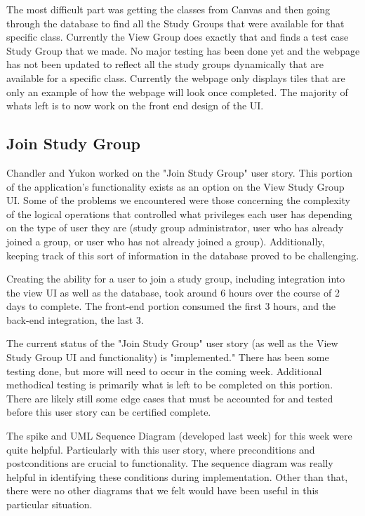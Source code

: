 \documentclass[12pt,letterpaper]{article}
\begin{document}
The most difficult part was getting the classes from Canvas and then going through the database to find all the Study Groups that were available for that specific class. Currently the View Group does exactly that and finds a test case Study Group that we made. No major testing has been done yet and the webpage has not been updated to reflect all the study groups dynamically that are available for a specific class. Currently the webpage only displays tiles that are only an example of how the webpage will look once completed. The majority of whats left is to now work on the front end design of the UI.

\subsection{Join Study Group}
Chandler and Yukon worked on the "Join Study Group" user story. This portion of the application's functionality exists as an option on the View Study Group UI. Some of the problems we encountered were those concerning the complexity of the logical operations that controlled what privileges each user has depending on the type of user they are (study group administrator, user who has already joined a group, or user who has not already joined a group). Additionally, keeping track of this sort of information in the database proved to be challenging. 

Creating the ability for a user to join a study group, including integration into the view UI as well as the database, took around 6 hours over the course of 2 days to complete. The front-end portion consumed the first 3 hours, and the back-end integration, the last 3.

The current status of the "Join Study Group" user story (as well as the View Study Group UI and functionality) is "implemented." There has been some testing done, but more will need to occur in the coming week. Additional methodical testing is primarily what is left to be completed on this portion. There are likely still some edge cases that must be accounted for and tested before this user story can be certified complete. 

The spike and UML Sequence Diagram (developed last week) for this week were quite helpful. Particularly with this user story, where preconditions and postconditions are crucial to functionality. The sequence diagram was really helpful in identifying these conditions during implementation. Other than that, there were no other diagrams that we felt would have been useful in this particular situation.
\end{document}
